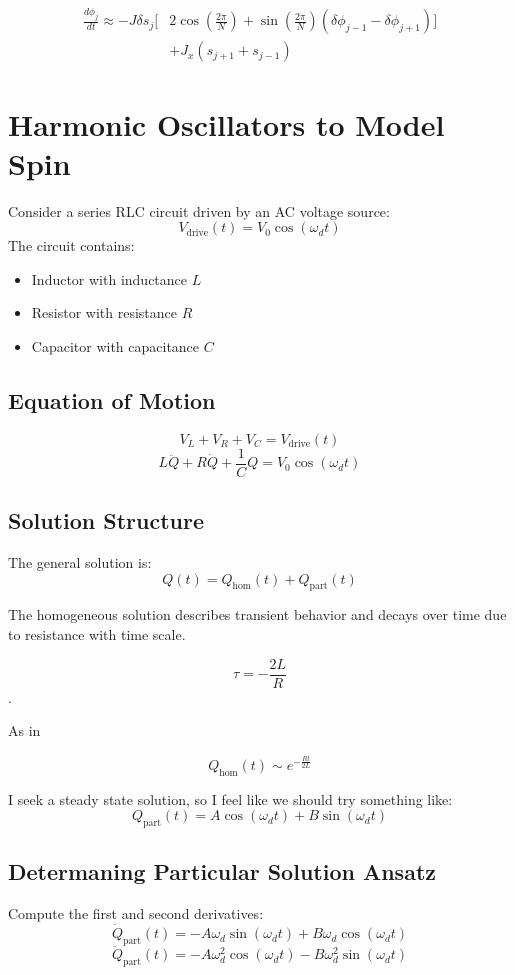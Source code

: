 \documentclass{article}
\begin{document}
\begin{align*}
    \frac{d\phi_j}{dt} \approx -J\delta s_j[&2\cos(\frac{2\pi}{N}) + \sin(\frac{2\pi}{N})(\delta\phi_{j-1} - \delta\phi_{j+1})] \\
                                  &+J_x(s_{j+1} + s_{j-1})
\end{align*}

\section{Harmonic Oscillators to Model Spin}

Consider a series RLC circuit driven by an AC voltage source:
\[
V_{\text{drive}}(t) = V_0 \cos(\omega_d t)
\]
The circuit contains:
\begin{itemize}
  \item Inductor with inductance $L$
  \item Resistor with resistance $R$
  \item Capacitor with capacitance $C$
\end{itemize}

\subsection{Equation of Motion}
\[
V_L + V_R + V_C = V_{\text{drive}}(t)
\]
\[
\boxed{L \ddot{Q} + R \dot{Q} + \frac{1}{C} Q = V_0 \cos(\omega_d t)}
\]

\subsection{Solution Structure}

The general solution is:
\[
Q(t) = Q_{\text{hom}}(t) + Q_{\text{part}}(t)
\]

The homogeneous solution describes transient behavior and decays over time due to resistance with time scale.

\[\tau = -\frac{2L}{R}\].

As in 

\[Q_{\text{hom}}(t) \sim e^{-\frac{Rt}{2L}}\]

I seek a steady state solution, so I feel like we should try something like:
\[
Q_{\text{part}}(t) = A \cos(\omega_d t) + B \sin(\omega_d t)
\]

\subsection{Determaning Particular Solution Ansatz}
Compute the first and second derivatives:
\[
\dot{Q}_{\text{part}}(t) = -A \omega_d \sin(\omega_d t) + B \omega_d \cos(\omega_d t)
\]
\[
\ddot{Q}_{\text{part}}(t) = -A \omega_d^2 \cos(\omega_d t) - B \omega_d^2 \sin(\omega_d t)
\]
\end{document}
